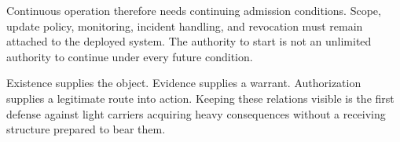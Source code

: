 Continuous operation therefore needs continuing admission conditions. Scope, update policy, monitoring, incident handling, and revocation must remain attached to the deployed system. The authority to start is not an unlimited authority to continue under every future condition.

Existence supplies the object. Evidence supplies a warrant. Authorization supplies a legitimate route into action. Keeping these relations visible is the first defense against light carriers acquiring heavy consequences without a receiving structure prepared to bear them.
